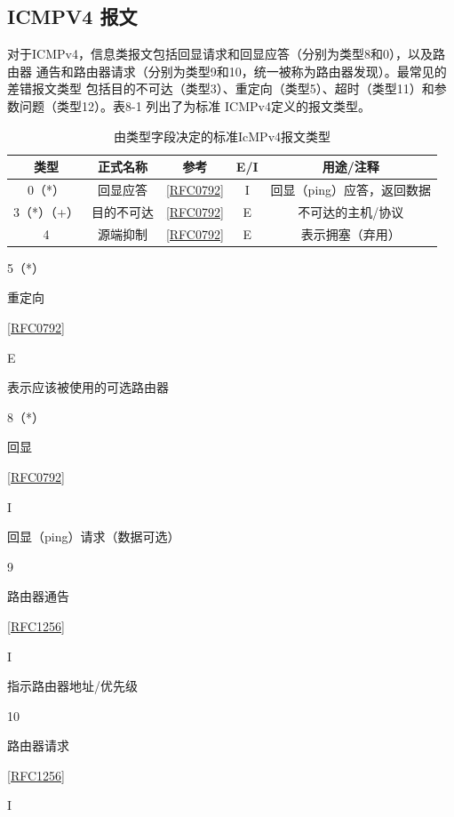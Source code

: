 \subsection{ICMPV4 报文}
对于ICMPv4，信息类报文包括回显请求和回显应答（分别为类型8和0），以及路由器
通告和路由器请求（分别为类型9和10，统一被称为路由器发现）。最常见的差错报文类型
包括目的不可达（类型3）、重定向（类型5）、超时（类型11）和参数问题（类型12）。表8-1
列出了为标准 ICMPv4定义的报文类型。

\begin{table}[]
	\caption{由类型字段决定的标准IcMPv4报文类型}
	\centering
	\begin{tabular}{c|c|c|c|c}
		\hline
		类型      & 正式名称  & 参考        & E/I & 用途/注释           \\ \hline
		0（*）    & 回显应答  & \href{https://www.rfc-editor.org/rfc/rfc0792}{[RFC0792]} & I   & 回显（ping）应答，返回数据 \\ \hline
		3（*）（+） & 目的不可达 & \href{https://www.rfc-editor.org/rfc/rfc0792}{[RFC0792]} & E   & 不可达的主机/协议       \\ \hline
		4       & 源端抑制  & \href{https://www.rfc-editor.org/rfc/rfc0792}{[RFC0792]} & E   & 表示拥塞（弃用）        \\ \hline
	\end{tabular}
\end{table}


5（*）

重定向

\href{https://www.rfc-editor.org/rfc/rfc0792}{[RFC0792]}

E

表示应该被使用的可选路由器

8（*）

回显

\href{https://www.rfc-editor.org/rfc/rfc0792}{[RFC0792]}

I

回显（ping）请求（数据可选）

9

路由器通告

\href{https://www.rfc-editor.org/rfc/rfc1256}{[RFC1256]}

I

指示路由器地址/优先级

10

路由器请求

\href{https://www.rfc-editor.org/rfc/rfc1256}{[RFC1256]}

I

